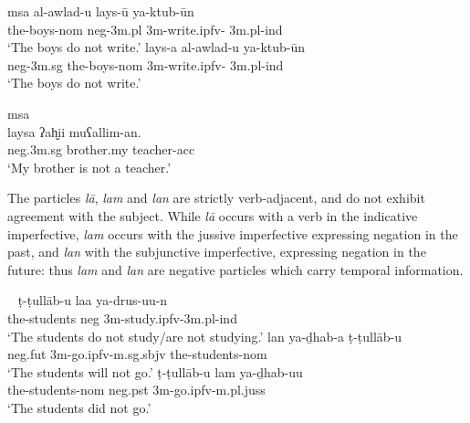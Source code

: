 \documentclass[output=paper,hidelinks]{langscibook}
\begin{document}
\ea
\label{laysa} {\sc msa}  \citep[10]{AlsharifSadler:09}
\ea
\gll al-awlad-u lays-\={u} ya-ktub-\={u}n\\
the-boys-{\sc nom} {\sc neg-3m.pl} {\sc 3m-}write.{\sc ipfv}-{\sc
  3m.pl-ind}\\
\glt `The boys do not write.'
\ex
\gll  lays-a al-awlad-u ya-ktub-\={u}n\\
 {\sc neg-3m.sg} the-boys-{\sc nom} {\sc 3m-}write.{\sc ipfv}-{\sc
  3m.pl-ind}\\
\glt `The boys do not write.'
\z
\z


\newpage

 \ea  \label{teacher} {\sc msa}  \citep[53]{Benmamoun:funct}\\
\gll laysa ʔah̬ii muʕallim-an.\\
{\sc neg.3m.sg} brother.my teacher-{\sc acc}\\
\glt `My brother is not a teacher.'
\z


 The particles  {\em l\={a}}, {\em  lam} and {\em  lan} are strictly verb-adjacent, and do not exhibit agreement with the subject. While  {\em l\=a} occurs with a verb in the indicative imperfective,   {\em lam} occurs with the
jussive imperfective expressing negation in the past, and {\em lan}
  with the subjunctive imperfective, expressing negation in the
  future: thus {\em lam} and {\em lan} are  negative particles
  which carry temporal information.





 \citep[95]{Benmamoun:funct}\
\ea
\gll ṭ-ṭull\={a}b-u laa ya-drus-uu-n\\
the-students {\sc neg} {\sc 3m}-study.{\sc ipfv}-{\sc 3m.pl-ind}\\
\glt `The students do not study/are not studying.'
\ex
\gll
lan ya-ḏhab-a ṭ-ṭull\={a}b-u \\
  {\sc neg.fut} {\sc 3m}-go.{\sc ipfv}-{\sc m.sg.sbjv} the-students-{\sc nom}
\\
\glt `The students will not go.'
\ex
\gll ṭ-ṭull\={a}b-u lam ya-ḏhab-uu\\
the-students-{\sc nom}  {\sc neg.pst} {\sc 3m}-go.{\sc ipfv}-{\sc m.pl.juss}\\
\glt `The students did not go.'
\z
\z
\end{document}

